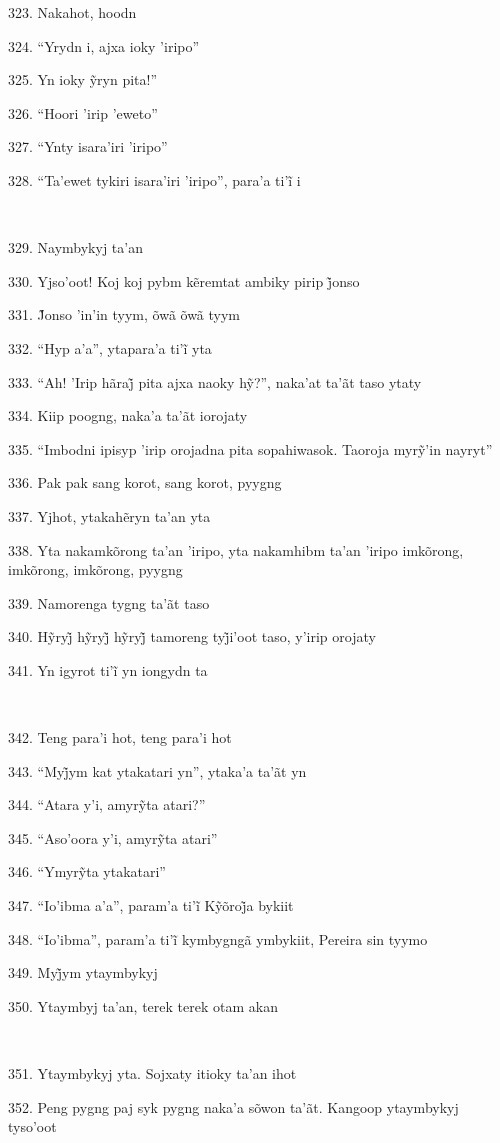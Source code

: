 323. Nakahot, hoodn

324. ``Yrydn i, ajxa ioky 'iripo''

325. Yn ioky ỹryn pita!''

326. ``Hoori 'irip 'eweto''

327. ``Ynty isara'iri 'iripo''

328. ``Ta’ewet tykiri isara’iri ’iripo'', para’a ti’ĩ i

~

329. Naymbykyj ta'an

330. Yjso’oot! Koj koj pybm kẽremtat ambiky pirip j̃onso

331. J̃onso ’in’in tyym, õwã õwã tyym

332. ``Hyp a’a'', ytapara’a ti’ĩ yta

333. ``Ah! ’Irip hãraj̃ pita ajxa naoky hỹ?'', naka’at ta’ãt taso ytaty

334. Kiip poogng, naka'a ta'ãt iorojaty

335. ``Imbodni ipisyp ’irip orojadna pita sopahiwasok. Taoroja myrỹ’in nayryt''

336. Pak pak sang korot, sang korot, pyygng

337. Yjhot, ytakahẽryn ta’an yta

338. Yta nakamkõrong ta'an 'iripo, yta nakamhibm ta'an 'iripo imkõrong,
imkõrong, imkõrong, pyygng

339. Namorenga tygng ta'ãt taso

340. Hỹryj̃ hỹryj̃ hỹryj̃ tamoreng tyj̃i’oot taso, y’irip orojaty

341. Yn igyrot ti’ĩ yn iongydn ta

~

342. Teng para'i hot, teng para'i hot

343. ``Myj̃ym kat ytakatari yn'', ytaka’a ta’ãt yn

344. ``Atara y’i, amyrỹta atari?''

345. ``Aso’oora y’i, amyrỹta atari''

346. ``Ymyrỹta ytakatari''

347. ``Io’ibma a’a'', param’a ti’ĩ Kỹõroj̃a bykiit

348. ``Io’ibma'', param’a ti’ĩ kymbygngã ymbykiit, Pereira sin tyymo

349. Myj̃ym ytaymbykyj

350. Ytaymbyj ta'an, terek terek otam akan

~

351. Ytaymbykyj yta. Sojxaty itioky ta'an ihot

352. Peng pygng paj syk pygng naka'a sõwon ta'ãt. Kangoop ytaymbykyj tyso'oot

